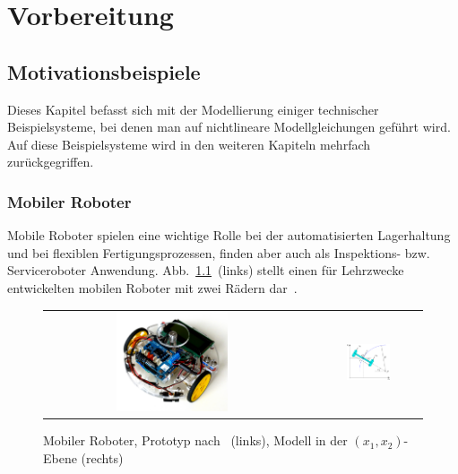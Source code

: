 
\part{Vorbereitung\label{part:Vorbereitung}}

\chapter{Motivationsbeispiele\label{chap:Einleitung}}

Dieses Kapitel befasst sich mit der Modellierung einiger technischer
Beispielsysteme, bei denen man auf nichtlineare Modellgleichungen
geführt wird. Auf diese Beispielsysteme wird in den weiteren Kapiteln
mehrfach zurückgegriffen.

\section{Mobiler Roboter\label{subsec:Mobiler-Roboter-Modellierung}}

Mobile Roboter spielen eine wichtige Rolle bei der automatisierten
Lagerhaltung und bei flexiblen Fertigungsprozessen, finden aber auch
als Inspektions- bzw. Serviceroboter Anwendung. Abb.~\ref{fig:mobiler-roboter-kinematisches-modell}~(links)
stellt einen für Lehrzwecke entwickelten mobilen Roboter mit zwei
Rädern dar~\cite{roebenack2015roboter}.

\begin{figure}
\begin{centering}
\begin{tabular}{ccc}
\includegraphics[width=0.45\textwidth]{Roboter_Foto} & \hspace*{0.05\textwidth} & \includegraphics[width=0.45\textwidth]{Roboter_kin_Modell}\tabularnewline
\end{tabular}
\par\end{centering}
\caption{Mobiler Roboter, Prototyp nach~\cite{roebenack2015roboter} (links),
Modell in der $(x_{1},x_{2})$-Ebene (rechts)\label{fig:mobiler-roboter-kinematisches-modell}}
\end{figure}


